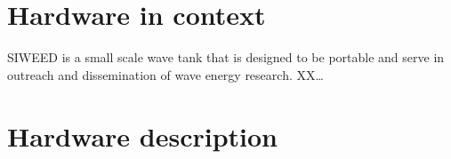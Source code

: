 \documentclass[11pt, letterpaper]{article}
\begin{document}
\section{Hardware in context} %
SIWEED is a small scale wave tank that is designed to be portable and serve in outreach and dissemination of wave energy research.
XX\dots{}

\section{Hardware description} %



\end{document}
